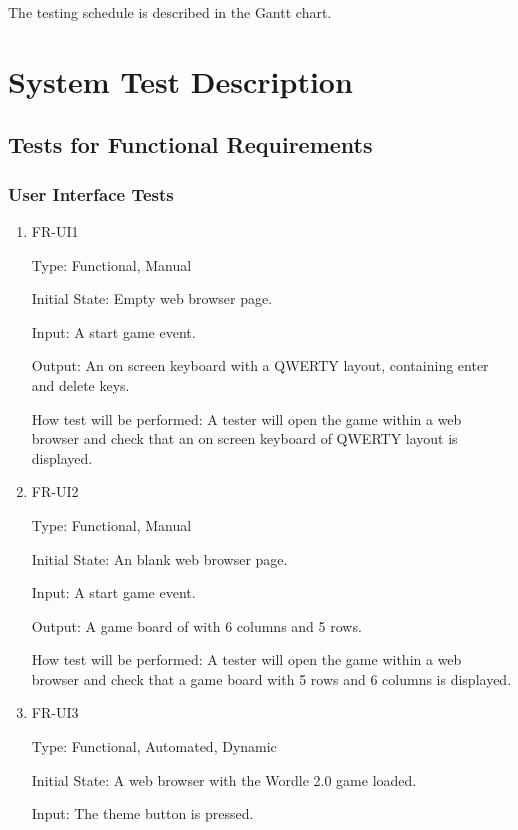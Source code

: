 \documentclass[12pt, titlepage]{article}
\begin{document}
The testing schedule is described in the Gantt chart.

\section{System Test Description}
	
\subsection{Tests for Functional Requirements}

\subsubsection{User Interface Tests}

\begin{enumerate}

\item{FR-UI1\\}

Type: Functional, Manual 
					
Initial State: Empty web browser page.
					
Input: A start game event.
					
Output: An on screen keyboard with a QWERTY layout, containing enter and delete 
keys.
					
How test will be performed: A tester will open the game within a web browser 
and check that an on screen keyboard of QWERTY layout is displayed.
					
\item{FR-UI2\\}

Type: Functional, Manual
					
Initial State: An blank web browser page.
					
Input: A start game event.
					
Output: A game board of with 6 columns and 5 rows.
					
How test will be performed:  A tester will open the game within a web browser 
and check that a game board with 5 rows and 6 columns is displayed.

\item{FR-UI3\\}

Type: Functional, Automated, Dynamic

Initial State: A web browser with the Wordle 2.0 game loaded.

Input: The theme button is pressed.


\end{enumerate}
\end{document}
